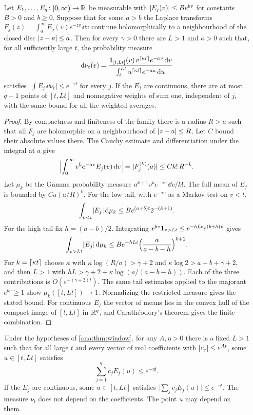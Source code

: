 \begin{theorem}\label{ana:thm:window}
Let $E_1,\dots,E_q\colon[0,\infty)\to\mathbb{R}$ be measurable with $\lvert E_j(v)\rvert\le Be^{bv}$ for
constants $B>0$ and $b\ge0$. Suppose that for some $a>b$ the Laplace transforms
$F_j(z)=\int_0^\infty E_j(v)e^{-zv}\,\dd v$ continue holomorphically to a neighbourhood of the
closed disc $\lvert z-a\rvert\le a$. Then for every $\gamma>0$ there are $L>1$ and $\kappa>0$ such
that, for all sufficiently large $t$, the probability measure
\[
 \mathrm{d}\nu_t(v)=\frac{\mathbf{1}_{[t,Lt]}(v)\,v^{\lceil\kappa t\rceil}e^{-av}\,\mathrm{d} v}
 {\int_t^{Lt}u^{\lceil\kappa t\rceil}e^{-au}\,\mathrm{d} u}
\]
satisfies $\bigl|\int E_j\,\dd\nu_t\bigr|\le e^{-\gamma t}$ for every $j$. If the $E_j$ are
continuous, there are at most $q+1$ points of $[t,Lt]$ and nonnegative weights of sum one,
independent of $j$, with the same bound for all the weighted averages.
\end{theorem}

\begin{proof}
By compactness and finiteness of the family there is a radius $R>a$ such that all $F_j$ are
holomorphic on a neighbourhood of $\lvert z-a\rvert\le R$. Let $C$ bound their absolute values there.
The Cauchy estimate and differentiation under the integral at $a$ give
\[
 \Bigl|\int_0^\infty v^ke^{-av}E_j(v)\,\mathrm{d} v\Bigr|=\lvert F_j^{(k)}(a)\rvert\le Ck!\,R^{-k}.
\]
Let $\mu_k$ be the Gamma probability measure $a^{k+1}v^ke^{-av}\,\dd v/k!$. The full mean of
$E_j$ is bounded by $Ca(a/R)^k$. For the low tail, with $e^{-av}$ as a Markov test on $v<t$,
\[
 \int_{v<t}\lvert E_j\rvert\,\mathrm{d}\mu_k\le Be^{(a+b)t}2^{-(k+1)}.
\]
For the high tail fix $h=(a-b)/2$. Integrating $e^{bv}\mathbf{1}_{v>Lt}\le e^{-hLt}e^{(b+h)v}$
gives
\[
 \int_{v>Lt}\lvert E_j\rvert\,\mathrm{d}\mu_k\le Be^{-hLt}\Bigl(\frac{a}{a-b-h}\Bigr)^{k+1}.
\]
For $k=\lceil\kappa t\rceil$ choose $\kappa$ with $\kappa\log(R/a)>\gamma+2$ and
$\kappa\log2>a+b+\gamma+2$, and then $L>1$ with $hL>\gamma+2+\kappa\log(a/(a-b-h))$. Each of the
three contributions is $O(e^{-(\gamma+2)t})$. The same tail estimates applied to the majorant
$e^{bv}\ge1$ show $\mu_k([t,Lt])\to1$. Normalizing the restricted measure gives the stated
bound. For continuous $E_j$ the vector of means lies in the convex hull of the compact image of
$[t,Lt]$ in $\mathbb{R}^q$, and Carath\'eodory's theorem gives the finite combination.
\end{proof}

\begin{corollary}\label{ana:cor:window}
Under the hypotheses of \cref{ana:thm:window}, for any $A,\eta>0$ there is a fixed $L>1$ such
that for all large $t$ and every vector of real coefficients with $\lvert c_j\rvert\le e^{At}$, some
$u\in[t,Lt]$ satisfies
\[
 \sum_{j=1}^qc_jE_j(u)\le e^{-\eta t}.
\]
If the $E_j$ are continuous, some $u\in[t,Lt]$ satisfies
$\bigl|\sum_jc_jE_j(u)\bigr|\le e^{-\eta t}$. The measure $\nu_t$ does not depend on the
coefficients. The point $u$ may depend on them.
\end{corollary}

